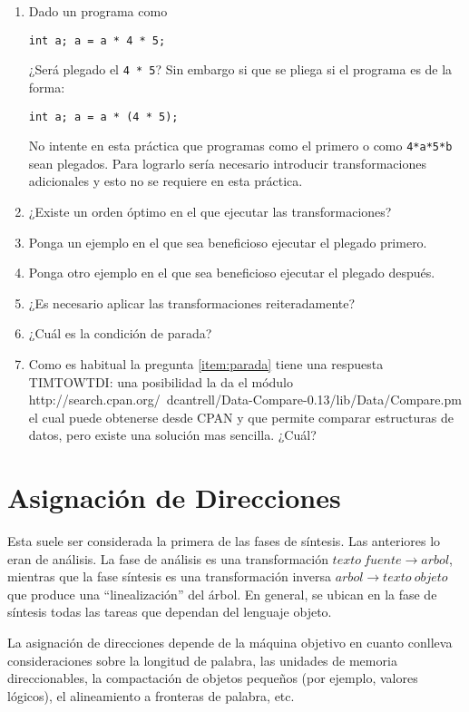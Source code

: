 \begin{enumerate}
\item
Dado un programa como

\begin{verbatim}
int a; a = a * 4 * 5;
\end{verbatim}
¿Será plegado el \verb|4 * 5|?
Sin embargo si que se pliega si el programa es de la forma:
\begin{verbatim}
int a; a = a * (4 * 5);
\end{verbatim}
No intente en esta práctica que programas como el primero  o como
\verb|4*a*5*b| sean plegados.
Para lograrlo sería necesario introducir transformaciones adicionales
y esto no se requiere en esta práctica.
\item
¿Existe un orden óptimo en el que ejecutar las transformaciones?
\item
Ponga un ejemplo en el que sea beneficioso ejecutar el plegado primero.
\item
Ponga otro ejemplo en el que sea beneficioso ejecutar el plegado después.
\item
¿Es necesario  aplicar las transformaciones reiteradamente? 
\item
\label{item:parada}
¿Cuál es la condición de parada?
\item
Como es habitual la pregunta 
\ref{item:parada} tiene 
una respuesta TIMTOWTDI: 
una posibilidad la da el módulo 
{http://search.cpan.org/~dcantrell/Data-Compare-0.13/lib/Data/Compare.pm}
el cual puede obtenerse desde CPAN y que permite comparar estructuras de datos, 
pero existe una solución mas sencilla. ¿Cuál?
\end{enumerate}

\section{Asignación de Direcciones}
Esta suele ser considerada  la primera de las fases de síntesis.
Las anteriores lo eran de análisis. La fase de análisis
es una transformación $texto\ fuente \rightarrow arbol$, mientras
que la fase síntesis es una transformación inversa
$arbol \rightarrow texto\ objeto$ que produce una ``linealización''
del árbol. En general, se ubican en la fase de síntesis todas
las tareas que dependan del lenguaje objeto.

La asignación de direcciones depende de la máquina objetivo en cuanto
conlleva consideraciones sobre la longitud de palabra, las unidades
de memoria direccionables, la compactación de objetos pequeños (por ejemplo,
valores lógicos), el alineamiento a fronteras de palabra, etc.


